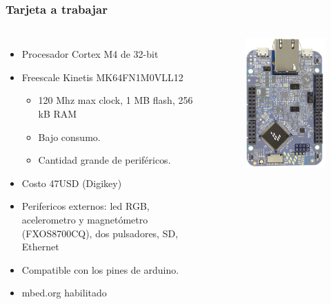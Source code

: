 \documentclass[10.5pt,scale=1.0,t,aspectratio=169,hyperref={pdfpagelabels=false}]{beamer}
\begin{document}
\begin{frame}
	\frametitle{Tarjeta a trabajar}
	\begin{columns}
		\begin{itemize}
			\item Procesador Cortex M4 de 32-bit
			\item Freescale Kinetis MK64FN1M0VLL12 
			\begin{itemize}
				\item 120 Mhz max clock, 1 MB flash, 256 kB RAM
				\item Bajo consumo.
				\item Cantidad grande de periféricos. 
			\end{itemize}
			\item Costo 47USD (Digikey)
			\item Perifericos externos: led RGB, acelerometro y magnetómetro (FXOS8700CQ), dos pulsadores, SD, Ethernet
			\item Compatible con los pines de arduino.
			\item mbed.org habilitado 
		\end{itemize}
		
		\begin{figure}
			\centering
			\includegraphics[scale=0.5]{FRDMK64F}
		\end{figure}
	\end{columns}
\end{frame}
\end{document}
